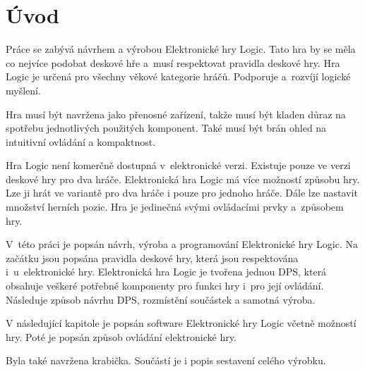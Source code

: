 \chapter*{Úvod}
{}

Práce se zabývá návrhem a výrobou Elektronické hry Logic. Tato hra by se měla co nejvíce podobat deskové hře a~musí respektovat pravidla deskové 
hry. Hra Logic je určená pro všechny věkové kategorie hráčů. Podporuje a~rozvíjí logické myšlení. 

Hra musí být navržena jako přenosné zařízení, takže musí být kladen důraz na spotřebu jednotlivých použitých komponent. Také musí být brán ohled na 
intuitivní ovládání a kompaktnost.

Hra Logic není komerčně dostupná v~elektronické verzi. Existuje pouze ve verzi deskové hry pro dva hráče. Elektronická hra Logic má více možností
způsobu hry. Lze ji hrát ve variantě pro dva hráče i pouze pro jednoho hráče. Dále lze nastavit množství herních pozic. Hra je jedinečná svými ovládacími 
prvky a~způsobem hry. 

V~této práci je popsán návrh, výroba a programování Elektronické hry Logic. Na začátku jsou popsána pravidla deskové hry, která jsou respektována i~u~elektronické hry. 
Elektronická hra Logic je tvořena jednou DPS, která obsahuje veškeré potřebné komponenty pro funkci hry i~pro její ovládání. Následuje způsob
návrhu DPS, rozmístění součástek a samotná výroba.

V následující kapitole je popsán software Elektronické hry Logic včetně možností hry. Poté je popsán způsob ovládání elektronické hry.

Byla také navržena krabička. Součástí je i popis sestavení celého výrobku. 




